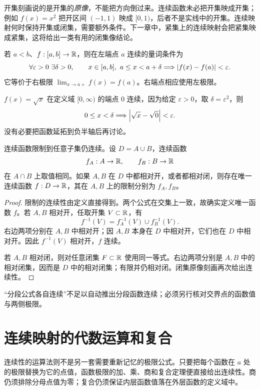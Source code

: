 开集刻画说的是开集的\emph{原像}，不能把方向倒过来。连续函数未必把开集映成开集；例如 \(f(x)=x^2\) 把开区间 \((-1,1)\) 映成 \([0,1)\)，后者不是实线中的开集。连续映射何时保持开集或闭集，需要额外条件。下一章中，紧集上的连续映射会把紧集映成紧集，这将给出一类有用的闭集像结论。


若 \(a<b\)、\(f:[a,b]\to\mathbb{R}\)，则在左端点 \(a\) 连续的量词条件为
\[
 \forall\varepsilon>0\ \exists\delta>0,\qquad
 x\in[a,b],\ a\le x<a+\delta
 \Longrightarrow\abs{f(x)-f(a)}<\varepsilon.
\]
它等价于右极限 \(\lim_{x\to a+}f(x)=f(a)\)。右端点相应使用左极限。

\begin{example}
\(f(x)=\sqrt x\) 在定义域 \([0,\infty)\) 的端点 \(0\) 连续，因为给定 \(\varepsilon>0\)，取 \(\delta=\varepsilon^2\)，则
\[
 0\le x<\delta\Longrightarrow\left|\sqrt x-\sqrt0\right|<\varepsilon.
\]
没有必要把函数延拓到负半轴后再讨论。
\end{example}

\begin{proposition}[限制与粘合]
连续函数限制到任意子集仍连续。设 \(D=A\cup B\)，连续函数
\[
 f_A:A\to\mathbb{R},\qquad f_B:B\to\mathbb{R}
\]
在 \(A\cap B\) 上取值相同。如果 \(A,B\) 在 \(D\) 中都相对开，或者都相对闭，则存在唯一连续函数 \(f:D\to\mathbb{R}\)，其在 \(A,B\) 上的限制分别为 \(f_A,f_B\)。
\end{proposition}

\begin{proof}
限制的连续性由定义直接得到。两个公式在交集上一致，故确实定义唯一函数 \(f\)。若 \(A,B\) 相对开，任取开集 \(V\subset\mathbb{R}\)，有
\[
 f^{-1}(V)=f_A^{-1}(V)\cup f_B^{-1}(V).
\]
右边两项分别在 \(A,B\) 中相对开；因 \(A,B\) 本身在 \(D\) 中相对开，它们也在 \(D\) 中相对开。因此 \(f^{-1}(V)\) 相对开，\(f\) 连续。

若 \(A,B\) 相对闭，则对任意闭集 \(F\subset\mathbb{R}\) 使用同一等式。右边两项分别是 \(A,B\) 中的相对闭集，因而是 \(D\) 中的相对闭集；有限并仍相对闭。闭集原像刻画再次给出连续性。
\end{proof}

“分段公式各自连续”不足以自动推出分段函数连续；必须另行核对交界点的函数值与两侧极限。

\section{连续映射的代数运算和复合}

连续性的运算法则不是另一套需要重新记忆的极限公式。只要把每个函数在 \(a\) 处的极限替换为它的点值，函数极限的加、乘、商和复合定理便直接给出连续性。商仍须排除分母点值为零；复合仍须保证内层函数值落在外层函数的定义域中。


